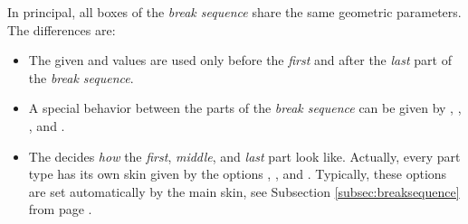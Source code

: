 \clearpage
In principal, all boxes of the \emph{break sequence} share the same geometric
parameters. The differences are:
\begin{itemize}
\item The given  and  values are
  used only before the \emph{first} and after the \emph{last} part
  of the \emph{break sequence}.
\item A special behavior between the parts of the \emph{break sequence} can
  be given by ,
  ,
  , and
  .
\item The  decides \emph{how} the \emph{first}, \emph{middle},
  and \emph{last} part look like. Actually, every part type has its own
  skin given by the options  , , and
  . Typically, these options are set automatically by
  the main skin, see Subsection \ref{subsec:breaksequence} from
  page \pageref{subsec:breaksequence}.
\end{itemize}


